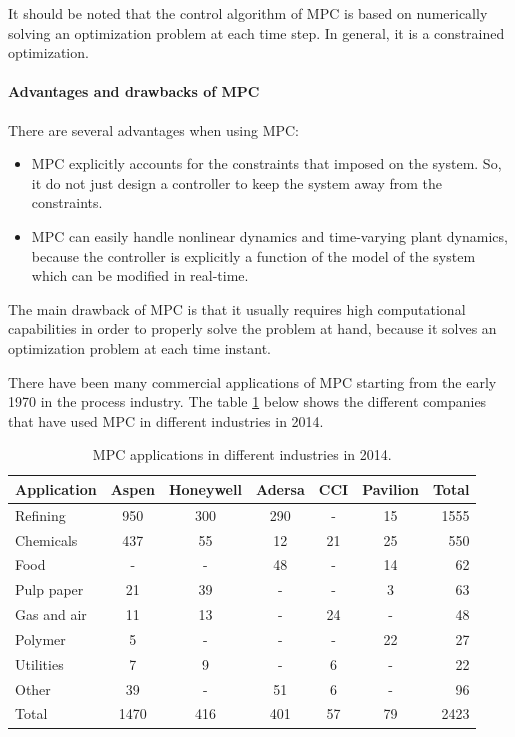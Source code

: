 \documentclass{thesisreport}
\begin{document}
 It should be noted that the control algorithm of MPC is based on numerically solving an optimization problem at each time step. In general, it is a constrained optimization.
 
 \paragraph{Advantages and drawbacks of MPC} There are several advantages when using MPC: 
 
 \begin{itemize}
 	\item MPC explicitly accounts for the constraints that imposed on the system. So, it do not just design a controller to keep the system away from the constraints.
 	\item MPC can easily handle nonlinear dynamics and time-varying plant dynamics, because the controller is explicitly a function of the model of the system which can be modified in real-time.
 \end{itemize}

 The main drawback of MPC is that it usually requires high computational capabilities in order to properly solve the problem at hand, because it solves an optimization problem at each time instant.
 
 There have been many commercial applications of MPC starting from the early 1970 in the process industry. The table \ref{table_MPC} below shows the different companies that have used MPC in different industries in 2014.
 


\begin{table}[h]
\setlength{\tabcolsep}{15pt} %
\renewcommand{\arraystretch}{1} %
 \caption{MPC applications in different industries in 2014.\cite{Kozak2014}}
 \label{table_MPC}
\begin{tabular}{l c c c c c r}
Application & Aspen & Honeywell & Adersa & CCI & Pavilion & Total \\
\hline
Refining & 950 & 300 & 290 & - & 15 & 1555 \\
Chemicals & 437 & 55 & 12 & 21 & 25 & 550 \\
Food & - & - & 48 & - & 14 & 62 \\
Pulp paper & 21 & 39 & - & - & 3 & 63 \\
Gas and air & 11 & 13 & - & 24 & - & 48 \\
Polymer & 5 & - & - & - & 22 & 27 \\
Utilities & 7 & 9 & - & 6 & - & 22 \\
Other & 39 & - & 51 & 6 & - & 96 \\
\hline 
\hline
Total & 1470 & 416 & 401 & 57 & 79 & 2423 \\
\end{tabular}
\end{table}
\end{document}
